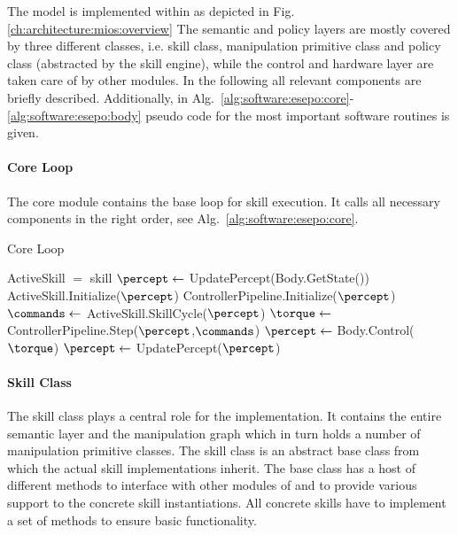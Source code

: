The \skillmodelabbr{} model is implemented within \softwareabbr{} as depicted in Fig. \ref{ch:architecture:mios:overview}
The semantic and policy layers are mostly covered by three different classes, i.e. skill class, manipulation primitive class and policy class (abstracted by the skill engine), while the control and hardware layer are taken care of by other modules.
In the following all relevant components are briefly described.
Additionally, in Alg.~\ref{alg:software:esepo:core}-\ref{alg:software:esepo:body} pseudo code for the most important software routines is given.

\paragraph{Core Loop}

The \softwareabbr{} core module contains the base loop for skill execution.
It calls all necessary components in the right order, see Alg.~\ref{alg:software:esepo:core}.

\begin{algorithm}
\caption{Core Loop}\label{alg:software:esepo:core}
\begin{algorithmic}[1]
\State ActiveSkill $=$ skill
\State $\percept \gets$ UpdatePercept(Body.GetState())
\State ActiveSkill.Initialize($\percept$)
\State ControllerPipeline.Initialize($\percept$)
\EndProcedure
{}
\State $\commands \gets $ ActiveSkill.SkillCycle($\percept$)
\State $\torque \gets $ ControllerPipeline.Step($\percept$,$\commands$)
\State $\percept \gets $ Body.Control($\torque$)
\State $\percept \gets$ UpdatePercept($\percept$)
\EndWhile
\EndProcedure
\end{algorithmic}
\end{algorithm}

\paragraph{Skill Class}

The skill class plays a central role for the \skillmodelabbr{} implementation.
It contains the entire semantic layer and the manipulation graph which in turn holds a number of manipulation primitive classes.
The skill class is an abstract base class from which the actual skill implementations inherit.
The base class has a host of different methods to interface with other modules of \softwareabbr{} and to provide various support to the concrete skill instantiations.
All concrete skills have to implement a set of methods to ensure basic functionality.

